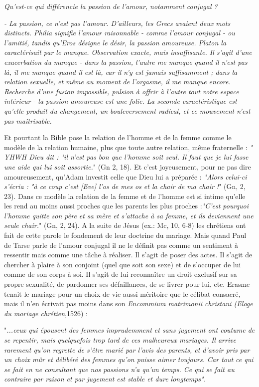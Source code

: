  \begin{displayquote}\emph{Qu'est-ce qui différencie la passion de l'amour, notamment conjugal ?} 
 
 \emph{- La passion, ce n'est pas l'amour. D'ailleurs, les Grecs avaient deux mots distincts. Philia signifie l'amour raisonnable - comme l'amour conjugal - ou l'amitié, tandis qu'Eros désigne le désir, la passion amoureuse. Platon la caractérisait par le manque. Observation exacte, mais insuffisante. Il s'agit d'une exacerbation du manque - dans la passion, l'autre me manque quand il n'est pas là, il me manque quand il est là, car il n'y est jamais suffisamment ; dans la relation sexuelle, et même au moment de l'orgasme, il me manque encore. Recherche d'une fusion impossible, pulsion à offrir à l'autre tout votre espace intérieur - la passion amoureuse est une folie. La seconde caractéristique est qu'elle produit du changement, un bouleversement radical, et ce mouvement n'est pas maîtrisable.} \end{displayquote}

 
 Et pourtant la Bible pose la relation de l'homme et de la femme comme le modèle de la relation humaine, plus que toute autre relation, même fraternelle : \emph{" YHWH Dieu dit : "il n'est pas bon que l'homme soit seul. Il faut que je lui fasse une aide qui lui soit assortie.}" (Gn 2, 18). Et c'est joyeusement, pour ne pas dire amoureusement, qu'Adam investit celle que Dieu lui a préparée : \emph{"Alors celui-ci s'écria : "à ce coup c'est [Eve] l'os de mes os et la chair de ma chair !}" (Gn, 2, 23). Dans ce modèle la relation de la femme et de l'homme est si intime qu'elle les rend au moins aussi proches que les parents les plus proches :\emph{"C'est pourquoi l'homme quitte son père et sa mère et s'attache à sa femme, et ils deviennent une seule chair.}" (Gn, 2, 24). A la suite de Jésus (ex.: Mc, 10, 6-8) les chrétiens ont fait de cette parole le fondement de leur doctrine du mariage. Mais quand Paul de Tarse parle de l'amour conjugal il ne le définit pas comme un sentiment à ressentir mais comme une tâche à réaliser. Il s'agit de poser des actes. Il s'agit de chercher à plaire à son conjoint (quel que soit son sexe) et de s'occuper de lui comme de son corps à soi. Il s'agit de lui reconnaître un droit exclusif sur sa propre sexualité, de pardonner ses défaillances, de se livrer pour lui, etc. Erasme tenait le mariage pour un choix de vie aussi méritoire que le célibat consacré, mais il n'en écrivait pas moins dans son \emph{Encommium matrimonii christani (Eloge du mariage chrétien},1526) : \begin{displayquote}"\emph{...ceux qui épousent des femmes imprudemment et sans jugement ont coutume de se repentir, mais quelquefois trop tard de ces malheureux mariages. Il arrive rarement qu'on regrette de s'être marié par l'avis des parents, et d'avoir pris par un choix mûr et délibéré des femmes qu'on puisse aimer toujours. Car tout ce qui se fait en ne consultant que nos passions n'a qu'un temps. Ce qui se fait au contraire par raison et par jugement est stable et dure longtemps".  }\end{displayquote}  
 
